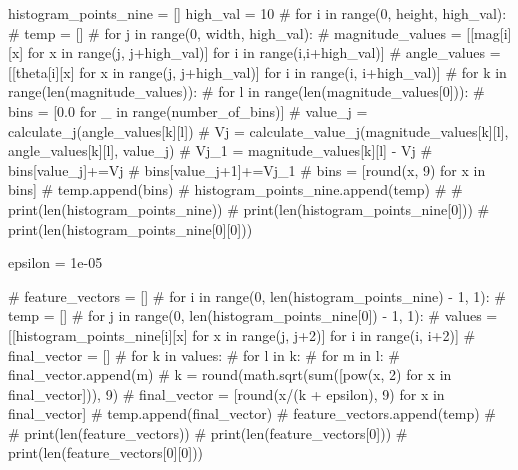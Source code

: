 \documentclass[
  letterpaper,
  DIV=11,
  numbers=noendperiod]{scrreprt}
\newenvironment{Shaded}{\begin{snugshade}}{\end{snugshade}}
\newcommand{\CommentTok}[1]{\textcolor[rgb]{0.37,0.37,0.37}{#1}}
\newcommand{\DecValTok}[1]{\textcolor[rgb]{0.68,0.00,0.00}{#1}}
\newcommand{\FloatTok}[1]{\textcolor[rgb]{0.68,0.00,0.00}{#1}}
\newcommand{\NormalTok}[1]{\textcolor[rgb]{0.00,0.23,0.31}{#1}}
\newcommand{\OperatorTok}[1]{\textcolor[rgb]{0.37,0.37,0.37}{#1}}
\begin{document}
\begin{Shaded}
\begin{Highlighting}[]
\NormalTok{histogram\_points\_nine }\OperatorTok{=}\NormalTok{ []}
\NormalTok{high\_val }\OperatorTok{=} \DecValTok{10}
\CommentTok{\# for i in range(0, height, high\_val):}
\CommentTok{\#   temp = []}
\CommentTok{\#   for j in range(0, width, high\_val):}
\CommentTok{\#     magnitude\_values = [[mag[i][x] for x in range(j, j+high\_val)] for i in range(i,i+high\_val)]}
\CommentTok{\#     angle\_values = [[theta[i][x] for x in range(j, j+high\_val)] for i in range(i, i+high\_val)]}
\CommentTok{\#     for k in range(len(magnitude\_values)):}
\CommentTok{\#       for l in range(len(magnitude\_values[0])):}
\CommentTok{\#         bins = [0.0 for \_ in range(number\_of\_bins)]}
\CommentTok{\#         value\_j = calculate\_j(angle\_values[k][l])}
\CommentTok{\#         Vj = calculate\_value\_j(magnitude\_values[k][l], angle\_values[k][l], value\_j)}
\CommentTok{\#         Vj\_1 = magnitude\_values[k][l] {-} Vj}
\CommentTok{\#         bins[value\_j]+=Vj}
\CommentTok{\#         bins[value\_j+1]+=Vj\_1}
\CommentTok{\#         bins = [round(x, 9) for x in bins]}
\CommentTok{\#     temp.append(bins)}
\CommentTok{\#   histogram\_points\_nine.append(temp)}
\CommentTok{\# }
\CommentTok{\# print(len(histogram\_points\_nine))}
\CommentTok{\# print(len(histogram\_points\_nine[0]))}
\CommentTok{\# print(len(histogram\_points\_nine[0][0]))}
\end{Highlighting}
\end{Shaded}

\begin{Shaded}
\begin{Highlighting}[]
\NormalTok{epsilon }\OperatorTok{=} \FloatTok{1e{-}05}

\CommentTok{\# feature\_vectors = []}
\CommentTok{\# for i in range(0, len(histogram\_points\_nine) {-} 1, 1):}
\CommentTok{\#   temp = []}
\CommentTok{\#   for j in range(0, len(histogram\_points\_nine[0]) {-} 1, 1):}
\CommentTok{\#     values = [[histogram\_points\_nine[i][x] for x in range(j, j+2)] for i in range(i, i+2)]}
\CommentTok{\#     final\_vector = []}
\CommentTok{\#     for k in values:}
\CommentTok{\#       for l in k:}
\CommentTok{\#         for m in l:}
\CommentTok{\#           final\_vector.append(m)}
\CommentTok{\#     k = round(math.sqrt(sum([pow(x, 2) for x in final\_vector])), 9)}
\CommentTok{\#     final\_vector = [round(x/(k + epsilon), 9) for x in final\_vector]}
\CommentTok{\#     temp.append(final\_vector)}
\CommentTok{\#   feature\_vectors.append(temp)}
\CommentTok{\#   }
\CommentTok{\# print(len(feature\_vectors))}
\CommentTok{\# print(len(feature\_vectors[0]))}
\CommentTok{\# print(len(feature\_vectors[0][0]))}
\end{Highlighting}
\end{Shaded}
\end{document}
